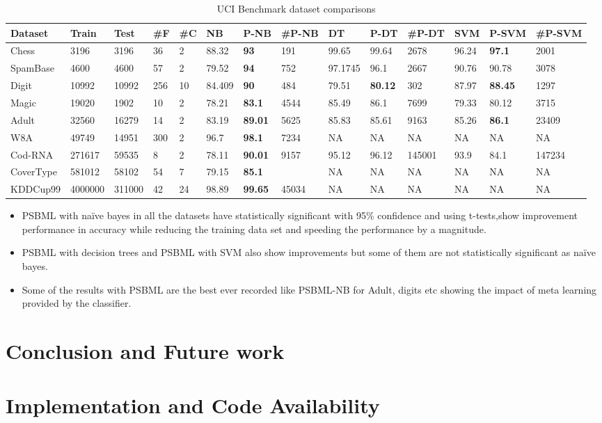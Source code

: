 \documentclass{llncs}
\begin{document}
\begin{enumerate}
\begin{table}
\caption{UCI Benchmark dataset comparisons}
\centering
\begin{tabular}{@{}llllllllllllll@{}}
\hline
Dataset &Train&Test&\#F&\#C&NB&P-NB&\#P-NB&DT&P-DT&\#P-DT&SVM&P-SVM&\#P-SVM\\\hline\hline
Chess&3196&3196&36&2&88.32&\bf93&191&99.65&99.64&2678&96.24&\bf97.1&2001\\
SpamBase&4600&4600&57&2&79.52&\bf94&752&97.1745&96.1&2667&90.76&90.78&3078\\
Digit&10992&10992&256&10&84.409&\bf90&484&79.51&\bf80.12&302&87.97&\bf88.45&1297\\
Magic&19020&1902&10&2&78.21&\bf83.1&4544&85.49&86.1&7699&79.33&80.12&3715\\
Adult&32560&16279&14&2&83.19&\bf89.01&5625&85.83&85.61&9163&85.26&\bf86.1&23409\\
W8A&49749&14951&300&2&96.7&\bf98.1&7234&NA&NA&NA&NA&NA&NA\\
Cod-RNA&271617 &59535&8&2&78.11&\bf90.01&9157&95.12&96.12&145001&93.9&84.1&147234\\
CoverType&581012&58102&54&7&79.15&\bf85.1&&NA&NA&NA&NA&NA&NA\\
KDDCup99&4000000&311000&42&24&98.89&\bf99.65&45034&NA&NA&NA&NA&NA&NA\\
\hline
\end{tabular}
\end{table}

\begin{itemize}
\item PSBML with naïve bayes in all the datasets have statistically significant with 95\% confidence and using t-tests,show  improvement performance in accuracy while reducing the training data set and speeding the performance by a magnitude.
\item PSBML with decision trees and PSBML with SVM also show improvements but some of them are not statistically significant as naïve bayes.
\item Some of the results with PSBML are the best ever recorded like PSBML-NB for Adult, digits etc showing the impact of meta learning provided by the classifier.

\end{itemize}



\end{enumerate}


\section{Conclusion and Future work}

\section{Implementation and Code Availability}


  
\end{document}
